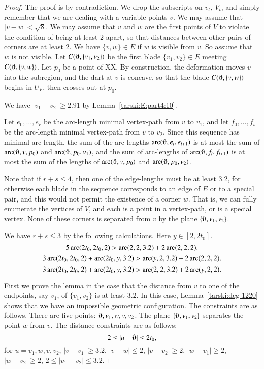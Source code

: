 \begin{proof}
The proof is by contradiction.  We drop the subscripts on $v_t$, $V_t$,
and simply remember that we are dealing with a variable points $v$.
We may assume that $|v-w|<\sqrt8$.
We may assume that $v$ and $w$ are the first points of $V$ to violate
the condition of being at least $2$ apart, so that distances
between other pairs of corners are at least $2$.  We have $\{v,w\}\in E$
if $w$ is visible from $v$. So assume
that $w$ is not visible.  Let $C(\orgn,\{v_1,v_2\})$ be the first
blade $\{v_1,v_2\}\in E$ meeting $C(\orgn,\{v,w\})$.  Let  $p_0$ be a point of XX.
By
construction, the deformation moves $v$ into the subregion, and
the dart at $v$ is concave, so that the blade
$C(\orgn,\{v,w\})$ begins in $U_F$, then crosses out at
$p_0$.

We have $|v_1-v_2|\ge2.91$ by Lemma~\ref{tarski:E:part4:10}.

Let $e_0,\ldots,e_r$ be the arc-length minimal vertex-path from $v$ to
$v_1$, and let $f_0,\ldots,f_s$ be the arc-length minimal vertex-path from
$v$ to $v_2$. Since this sequence has minimal arc-length, the
sum of the arc-lengths $\arc(\orgn,e_i,e_{i+1})$ is at most the sum of 
$\arc(\orgn,v,p_0)$ and $\arc(\orgn,p_0,v_1)$, and the sum of arc-lengths of $\arc(\orgn,f_i,f_{i+1})$
is at most the sum of the lengths of $\arc(\orgn,v,p_0)$ and $\arc(\orgn,p_0,v_2)$.

Note that if $r+s\le4$, then one of the edge-lengths must be at
least $3.2$, for otherwise each blade in the sequence corresponds to
an 
edge of $E$ or to a special pair, and this would not permit
the existence of a corner $w$. That is, we can fully enumerate the
vertices of $V$, and each is a
point in a vertex-path, or is a special vertex.
None of these corners is separated from $v$ by the plane
$\{\orgn,v_1,v_2\}$.

We have $r+s\le3$ by the following calculations.  Here
$y\in[2,2t_0]$.
    $$5\operatorname{arc}(2t_0,2t_0,2) > \operatorname{arc}(2,2,3.2)+ 2 \operatorname{arc}(2,2,2).$$
    $$3\operatorname{arc}(2t_0,2t_0,2) + \operatorname{arc}(2t_0,y,3.2) > \operatorname{arc}(y,2,3.2) + 2 \operatorname{arc}(2,2,2).$$
    $$3\operatorname{arc}(2t_0,2t_0,2) + \operatorname{arc}(2t_0,y,3.2) > \operatorname{arc}(2,2,3.2) + 2\operatorname{arc}(y,2,2).$$


First we prove the lemma in the case that the distance from
$v$ to one of the endpoints, say $v_1$, of $\{v_1,v_2\}$ is at least
$3.2$. In this case, Lemma~\ref{tarski:dcg-1220} shows
that we have an
impossible geometric configuration. The
constraints are as follows.  There are five points: $\orgn,v_1,w,v,v_2$.
The plane $\{\orgn,v_1,v_2\}$ separates the point $w$ from $v$. The
distance constraints are as follows:
    $$2\le |u-\orgn| \le 2t_0,$$
for $u=v_1,w,v,v_2$, $|v-v_1|\ge 3.2$, $|v-w|\le2$, $|v-v_2|\ge2$,
$|w-v_1|\ge2$, $|w-v_2|\ge2$, $2\le |v_1-v_2|\le 3.2$.


\end{proof}
